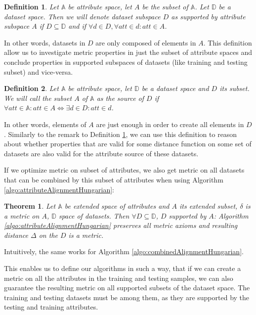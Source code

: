 \documentclass{article}
\newtheorem{definition}{Definition}
\newtheorem{theorem}{Theorem}
\newcommand{\attributeDistance}{\delta}
\newcommand{\globalDistance}{\Delta}
\begin{document}
\begin{refsegment}
\begin{definition}
	\label{definition:supportedDatasets}
	Let $\mathbb{A}$ be attribute space, let $A$ be the subset of $\mathbb{A}$. Let $\mathbb{D}$ be a dataset space. Then we will denote dataset subspace $D$ as \emph{supported} by attribute subspace $A$ if $D \subseteq \mathbb{D}$ and if $\forall d \in D,\forall att \in d:att \in A$. 
\end{definition} 
In other words, datasets in $D$ are only composed of elements in $A$. This definition allow us to investigate metric properties in just the subset of attribute spaces and conclude properties in supported subspaces of datasets (like training and testing subset) and vice-versa.

\begin{definition}
	Let $\mathbb{A}$ be attribute space, let $\mathbb{D}$ be a dataset space and $D$ its subset. We will call the subset $A$ of $\mathbb{A}$ as the \emph{source} of $D$ if $\forall att \in \mathbb{A}: att \in A \iff \exists d \in D: att \in d$. 
\end{definition} 
In other words, elements of $A$ are just enough in order to create all elements in $D$. Similarly to the remark to Definition \ref{definition:supportedDatasets}, we can use this definition to reason about whether properties that are valid for some distance function on some set of datasets are also valid for the attribute source of these datasets.

If we optimize metric on subset of attributes, we also get metric on all datasets that can be combined by this subset of attributes when using Algorithm \ref{algo:attributeAlignmentHungarian}:
\begin{theorem}
	\label{theorem:metricPreservationSuportedSpaces}
	Let $\mathbb{A}$ be extended space of attributes and $A$ its extended subset, $\attributeDistance$ is a metric on $A$, $\mathbb{D}$ space of datasets. Then $\forall D \subseteq \mathbb{D}$, $D$ supported by $A$: Algorithm \ref{algo:attributeAlignmentHungarian} preserves all metric axioms and resulting distance $\globalDistance$ on the $D$ is a metric.
\end{theorem}
Intuitively, the same works for Algorithm \ref{algo:combinedAlignmentHungarian}.

This enables us to define our algorithms in such a way, that if we can create a metric on all the attributes in the training and testing samples, we can also guarantee the resulting metric on all supported subsets of the dataset space. The training and testing datasets must be among them, as they are supported by the testing and training attributes.


\end{refsegment}
\end{document}
